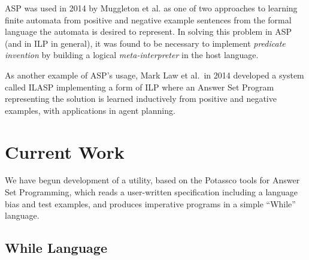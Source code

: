 \documentclass[a4paper,twoside,notitlepage]{article}
\begin{document}
ASP was used in 2014 by Muggleton et al.\cite{metagol} as one of two 
approaches to learning finite automata from positive and negative example 
sentences from the formal language the automata is desired to represent. 
In solving this problem in ASP (and in ILP in general), it was found to be 
necessary to implement \emph{predicate invention} by building a logical 
\emph{meta-interpreter} in the host language.

As another example of ASP's usage, Mark Law et al.\ in 2014 developed a 
system called ILASP\cite{ilasp} implementing a form of ILP where an Answer 
Set Program representing the solution is learned inductively from positive 
and negative examples, with applications in agent planning.

\section{Current Work}

We have begun development of a utility, based on the Potassco\cite{potassco} 
tools for Answer Set Programming, which reads a user-written specification 
including a language bias and test examples, and produces imperative programs 
in a simple ``While'' language.

\subsection{While Language} \label{sec:outlng}
\end{document}
